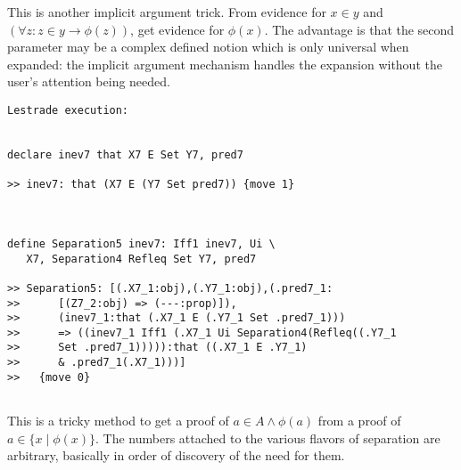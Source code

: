 \documentclass[12pt]{article}
\begin{document}
This is another implicit argument trick.  From evidence for $x \in y$ and $(\forall z: z \in y \rightarrow \phi(z))$, get evidence for $\phi(x)$.  The advantage is
that the second parameter may be a complex defined notion which is only universal when expanded:  the implicit argument mechanism handles the expansion without the user's attention being needed.

\begin{verbatim}Lestrade execution:


declare inev7 that X7 E Set Y7, pred7

>> inev7: that (X7 E (Y7 Set pred7)) {move 1}



define Separation5 inev7: Iff1 inev7, Ui \
   X7, Separation4 Refleq Set Y7, pred7

>> Separation5: [(.X7_1:obj),(.Y7_1:obj),(.pred7_1:
>>      [(Z7_2:obj) => (---:prop)]),
>>      (inev7_1:that (.X7_1 E (.Y7_1 Set .pred7_1)))
>>      => ((inev7_1 Iff1 (.X7_1 Ui Separation4(Refleq((.Y7_1
>>      Set .pred7_1))))):that ((.X7_1 E .Y7_1)
>>      & .pred7_1(.X7_1)))]
>>   {move 0}


\end{verbatim}

This is a tricky method to get a proof of $a \in A \wedge \phi(a)$ from a proof of $a \in \{x \mid \phi(x)\}$.  The numbers attached to the various flavors of separation are arbitrary, basically in order of discovery of the need for them.
\end{document}
